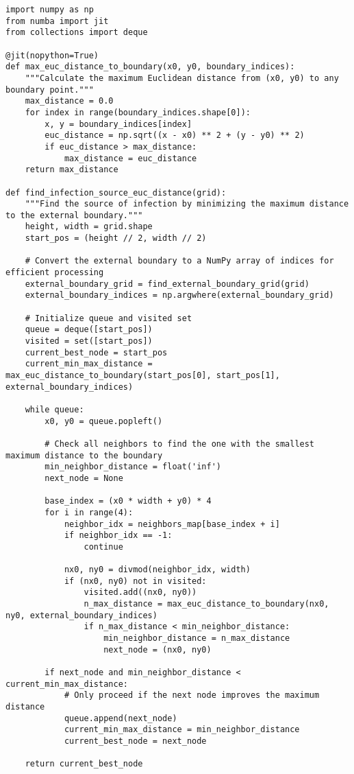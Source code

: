 \begin{lstlisting}[caption=Distance Analysis Algorithm, label=lst:distance-analysis]
import numpy as np
from numba import jit
from collections import deque

@jit(nopython=True)
def max_euc_distance_to_boundary(x0, y0, boundary_indices):
    """Calculate the maximum Euclidean distance from (x0, y0) to any boundary point."""
    max_distance = 0.0
    for index in range(boundary_indices.shape[0]):
        x, y = boundary_indices[index]
        euc_distance = np.sqrt((x - x0) ** 2 + (y - y0) ** 2)
        if euc_distance > max_distance:
            max_distance = euc_distance
    return max_distance

def find_infection_source_euc_distance(grid):
    """Find the source of infection by minimizing the maximum distance to the external boundary."""
    height, width = grid.shape
    start_pos = (height // 2, width // 2)

    # Convert the external boundary to a NumPy array of indices for efficient processing
    external_boundary_grid = find_external_boundary_grid(grid)
    external_boundary_indices = np.argwhere(external_boundary_grid)
    
    # Initialize queue and visited set
    queue = deque([start_pos])
    visited = set([start_pos])
    current_best_node = start_pos
    current_min_max_distance = max_euc_distance_to_boundary(start_pos[0], start_pos[1], external_boundary_indices)

    while queue:
        x0, y0 = queue.popleft()

        # Check all neighbors to find the one with the smallest maximum distance to the boundary
        min_neighbor_distance = float('inf')
        next_node = None

        base_index = (x0 * width + y0) * 4
        for i in range(4):
            neighbor_idx = neighbors_map[base_index + i]
            if neighbor_idx == -1:
                continue

            nx0, ny0 = divmod(neighbor_idx, width)
            if (nx0, ny0) not in visited:
                visited.add((nx0, ny0))
                n_max_distance = max_euc_distance_to_boundary(nx0, ny0, external_boundary_indices)
                if n_max_distance < min_neighbor_distance:
                    min_neighbor_distance = n_max_distance
                    next_node = (nx0, ny0)
                    
        if next_node and min_neighbor_distance < current_min_max_distance:
            # Only proceed if the next node improves the maximum distance
            queue.append(next_node)
            current_min_max_distance = min_neighbor_distance
            current_best_node = next_node

    return current_best_node
\end{lstlisting}

